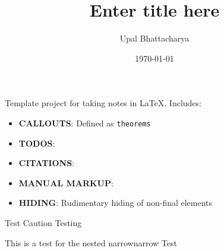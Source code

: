 \documentclass[a4paper,colorinlistoftodos]{article}
\author{Upal Bhattacharya}
\date{\today}
\title{Enter title here}
\begin{document}
\maketitle

\begingroup
    \hypersetup{linkcolor=black}
    \tableofcontents
    \listoftodos
    \pagebreak
\endgroup

\linenumbers

Template project for taking notes in \LaTeX.
Includes:
\begin{itemize}
\item \textbf{CALLOUTS}: Defined as \verb|theorems|
\item \textbf{TODOS}:
\item \textbf{CITATIONS}: \cite{openai2024HelloGpt4o}
\item \textbf{MANUAL MARKUP}: 
\item \textbf{HIDING}: Rudimentary hiding of non-final elements
\end{itemize}

\begin{caution}{Test Caution}{}
  Testing
  \begin{answer}{This is a test for the nested narrow}{narrow}
    Test
  \end{answer}

\end{caution}




\end{document}
